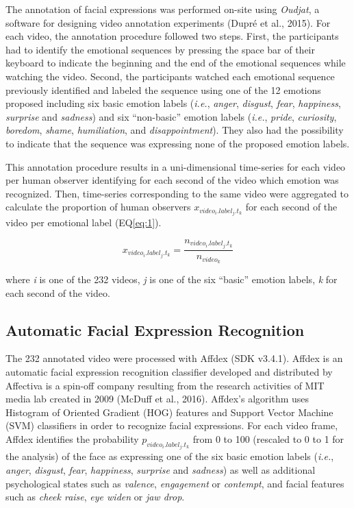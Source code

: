 \documentclass[man]{apa6}
\begin{document}
The annotation of facial expressions was performed on-site using \emph{Oudjat}, a software for designing video annotation experiments (Dupré et al., 2015). For each video, the annotation procedure followed two steps. First, the participants had to identify the emotional sequences by pressing the space bar of their keyboard to indicate the beginning and the end of the emotional sequences while watching the video. Second, the participants watched each emotional sequence previously identified and labeled the sequence using one of the 12 emotions proposed including six basic emotion labels (\emph{i.e.}, \emph{anger}, \emph{disgust}, \emph{fear}, \emph{happiness}, \emph{surprise} and \emph{sadness}) and six \enquote{non-basic} emotion labels (\emph{i.e.}, \emph{pride}, \emph{curiosity}, \emph{boredom}, \emph{shame}, \emph{humiliation}, and \emph{disappointment}). They also had the possibility to indicate that the sequence was expressing none of the proposed emotion labels.

This annotation procedure results in a uni-dimensional time-series for each video per human observer identifying for each second of the video which emotion was recognized. Then, time-series corresponding to the same video were aggregated to calculate the proportion of human observers \(x_{video_{i}.label_{j}.t_{k}}\) for each second of the video per emotional label (EQ\ref{eq:1}).

\begin{equation}
\label{eq:1}
x_{video_{i}.label_{j}.t_{k}} = \frac{n_{video_{i}.label_{j}.t_{k}}}{n_{video_{k}}}
\end{equation}

where \emph{i} is one of the 232 videos, \emph{j} is one of the six \enquote{basic} emotion labels, \emph{k} for each second of the video.

\hypertarget{automatic-facial-expression-recognition}{%
\subsection{Automatic Facial Expression Recognition}\label{automatic-facial-expression-recognition}}

The 232 annotated video were processed with Affdex (SDK v3.4.1). Affdex is an automatic facial expression recognition classifier developed and distributed by Affectiva is a spin-off company resulting from the research activities of MIT media lab created in 2009 (McDuff et al., 2016). Affdex's algorithm uses Histogram of Oriented Gradient (HOG) features and Support Vector Machine (SVM) classifiers in order to recognize facial expressions. For each video frame, Affdex identifies the probability \(p_{video_{i}.label_{j}.t_{k}}\) from 0 to 100 (rescaled to 0 to 1 for the analysis) of the face as expressing one of the six basic emotion labels (\emph{i.e.}, \emph{anger}, \emph{disgust}, \emph{fear}, \emph{happiness}, \emph{surprise} and \emph{sadness}) as well as additional psychological states such as \emph{valence}, \emph{engagement} or \emph{contempt}, and facial features such as \emph{cheek raise}, \emph{eye widen} or \emph{jaw drop}.
\end{document}
